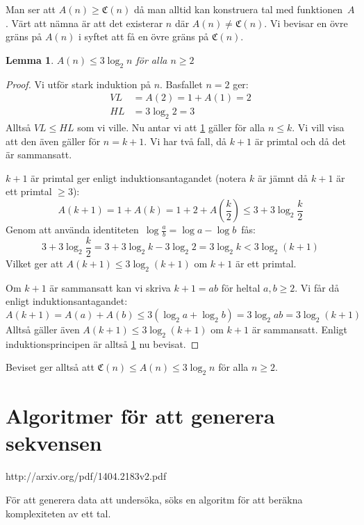 \documentclass[a4paper,titlepage,draft]{article}
\newcommand{\C}[1]{\mathfrak C \left( #1 \right)}
\newtheorem{lemma}{Lemma}
\begin{document}
    Man ser att $A(n)\ge\C{n}$ då man alltid kan konstruera tal med
    funktionen~$A$. Värt att nämna är att det existerar $n$ där $A(n)\neq\C{n}$.
    Vi bevisar en övre gräns på $A(n)$ i syftet att få en övre gräns på $\C{n}$.

    \begin{lemma}
        $A(n)\le 3 \log_2{n}$ \quad för alla $n\ge2$
        \label{lemma:adrian}
    \end{lemma}
    \begin{proof}
        Vi utför stark induktion på $n$. Basfallet $n=2$ ger:
        \begin{align*}
            VL &=A(2)=1+A(1)=2\\
            HL &= 3 \log_2{2}=3 
        \end{align*}
        Alltså $VL \le HL$ som vi ville.
        Nu antar vi att \cref{lemma:adrian} gäller för alla $n \le k$. Vi vill
        visa att den även gäller för $n=k+1$.
        Vi har två fall, då $k+1$ är primtal och då det är sammansatt.

        $k+1$ är primtal ger enligt induktionsantagandet (notera $k$ är jämnt
        då $k+1$ är ett primtal $\ge3$):
        $$A(k+1) = 1 + A(k) = 1+2+A\left(\frac{k}{2}\right) \le 3 + 3 \log_2\frac{k}{2}$$
        Genom att använda identiteten \,$\log \frac{a}{b}=\log a -\log b$\, fås:
        $$ 3 + 3 \log_2\frac{k}{2} = 3 + 3\log_2 k - 3\log_2 2 = 3\log_2 k < 3\log_2 (k+1)$$
        Vilket ger att $A(k+1)\le 3\log_2 (k+1)$ om $k+1$ är ett primtal.

        Om $k+1$ är sammansatt kan vi skriva $k+1 = ab$ för heltal $a,b \ge 2$.
        Vi får då enligt induktionsantagandet:
        $$A(k+1) = A(a)+A(b) \le 3(\log_2a + \log_2b) = 3\log_2 ab = 3\log_2
        (k+1)$$ Alltså gäller även $A(k+1) \le 3\log_2 (k+1)$ om $k+1$ är
        sammansatt. Enligt induktionsprincipen är alltså \cref{lemma:adrian} nu
        bevisat.
    \end{proof}

    Beviset ger alltså att $\C{n}\le A(n)\le 3\log_2 n$ för alla $n\ge2$.




\section{Algoritmer för att generera sekvensen}

http://arxiv.org/pdf/1404.2183v2.pdf

För att generera data att undersöka, söks en algoritm för att beräkna komplexiteten av ett tal.
\end{document}
